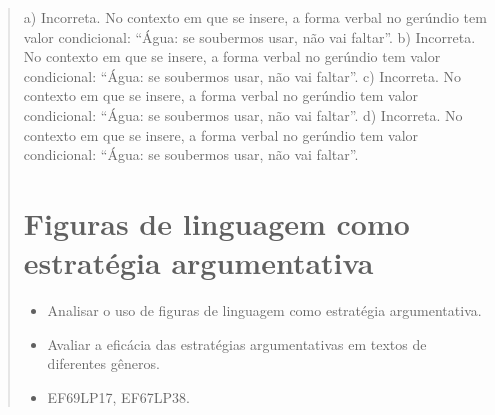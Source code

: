 \begin{quote}
{a) Incorreta. No contexto em que se insere, a forma verbal no gerúndio tem valor condicional: 
``Água: se soubermos usar, não vai faltar''. 
b) Incorreta. No contexto em que se insere, a forma verbal no gerúndio tem valor condicional: 
``Água: se soubermos usar, não vai faltar''. 
c) Incorreta. No contexto em que se insere, a forma verbal no gerúndio tem valor condicional: 
``Água: se soubermos usar, não vai faltar''.
d) Incorreta. No contexto em que se insere, a forma verbal no gerúndio tem valor condicional: 
``Água: se soubermos usar, não vai faltar''.}  

\chapter{Figuras de linguagem como estratégia argumentativa}


\begin{itemize}
  
  \item Analisar o uso de figuras de linguagem como estratégia argumentativa.

  \item Avaliar a eficácia das estratégias argumentativas em textos de diferentes gêneros.

\end{itemize}


\begin{itemize}

  \item EF69LP17, EF67LP38.

\end{itemize}

\end{quote}
